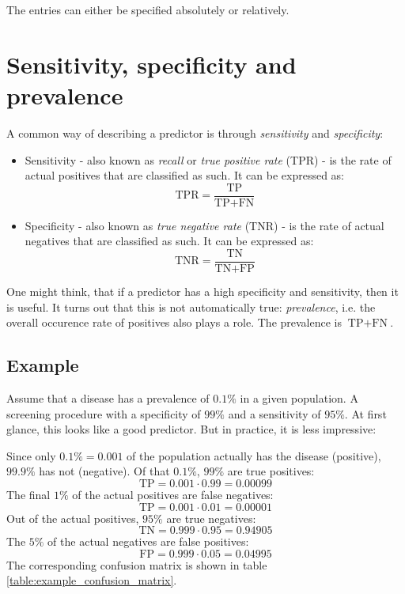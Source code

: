 \documentclass[12pt,a4paper]{article}
\numberwithin{equation}{section}
\begin{document}
The entries can either be specified absolutely or relatively.

\section{Sensitivity, specificity and prevalence}
A common way of describing a predictor is through \textit{sensitivity} and \textit{specificity}:
\begin{itemize}
\item Sensitivity - also known as \textit{recall} or \textit{true positive rate} (TPR) - is the rate of actual positives that are classified as such. It can be expressed as:
\begin{equation}
\textrm{TPR}=\frac{\textrm{TP}}{\textrm{TP}+\textrm{FN}}
\end{equation}
\item Specificity - also known as \textit{true negative rate} (TNR) - is the rate of actual negatives that are classified as such. It can be expressed as:
\begin{equation}
\textrm{TNR}=\frac{\textrm{TN}}{\textrm{TN}+\textrm{FP}}
\end{equation}
\end{itemize}

One might think, that if a predictor has a high specificity and sensitivity, then it is useful. It turns out that this is not automatically true: \textit{prevalence}, i.e. the overall occurence rate of positives also plays a role. The prevalence is $\textrm{TP}+\textrm{FN}$.

\subsection{Example}
Assume that a disease has a prevalence of $0.1\%$ in a given population. A screening procedure with a specificity of $99\%$ and a sensitivity of $95\%$. At first glance, this looks like a good predictor. But in practice, it is less impressive:

Since only $0.1\%=0.001$ of the population actually has the disease (positive), $99.9\%$ has not (negative). Of that $0.1\%$, $99\%$ are true positives:
\begin{equation}
\textrm{TP}=0.001\cdot 0.99=0.00099
\end{equation}
The final $1\%$ of the actual positives are false negatives:
\begin{equation}
\textrm{TP}=0.001\cdot 0.01=0.00001
\end{equation}
Out of the actual positives, $95\%$ are true negatives:
\begin{equation}
\textrm{TN}=0.999\cdot 0.95=0.94905
\end{equation}
The $5\%$ of the actual negatives are false positives:
\begin{equation}
\textrm{FP}=0.999\cdot 0.05=0.04995
\end{equation}
The corresponding confusion matrix is shown in table \ref{table:example_confusion_matrix}.
\end{document}
